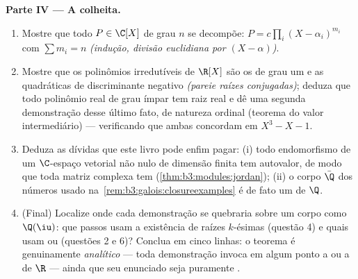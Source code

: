 \begin{problem}
\medskip
\noindent\textbf{Parte IV --- A colheita.}
\begin{enumerate}[resume]
  \item Mostre que todo $P \in \C[X]$ de grau $n$ se decompõe: $P = c\prod_{i}(X - \alpha_i)^{m_i}$ com
        $\sum m_i =
        n$ \emph{(indução, divisão euclidiana por $(X -
        \alpha)$)}.
  \item Mostre que os polinômios irredutíveis de $\R[X]$ são os de
        grau um e as quadráticas de discriminante negativo \emph{(pareie
        raízes conjugadas)}; deduza que todo polinômio real de grau
        ímpar tem raiz real e dê uma segunda demonstração desse último
        fato, de natureza ordinal (teorema do valor intermediário) ---
        verificando que ambas concordam em $X^3 - X - 1$.
  \item Deduza as dívidas que este livro pode enfim pagar: (i) todo
        endomorfismo de um $\C$-espaço vetorial não nulo de dimensão
        finita tem autovalor, de modo que toda matriz complexa tem
         (\cref{thm:b3:modules:jordan}); (ii) o corpo $\bar\Q$ dos
        números  usado na~\cref{rem:b3:galois:closureexamples} é de fato um  de $\Q$.
  \item (Final) Localize onde cada demonstração se quebraria sobre um
        corpo como $\Q(\iu)$: que passos usam a existência de raízes
        $k$-ésimas (questão 4) e quais usam  ou 
        (questões 2 e 6)? Conclua em cinco linhas: o teorema é
        genuinamente \emph{analítico} --- toda demonstração invoca em
        algum ponto a  ou a  de $\R$ --- ainda
        que seu enunciado seja puramente .
\end{enumerate}


\end{problem}
